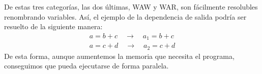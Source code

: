 \documentclass[11pt,twoside,a4paper]{article}
\begin{document}
De estas tres categorías, las dos últimas, WAW y WAR, son fácilmente resolubles renombrando variables.
Así, el ejemplo de la dependencia de salida podría ser resuelto de la siguiente manera:
\begin{gather*}
	a = b + c \quad\to\quad a_1 = b + c\\
	a = c + d \quad\to\quad a_2 = c + d
\end{gather*}
De esta forma, aunque aumentemos la memoria que necesita el programa, conseguimos que pueda ejecutarse de
forma paralela.
\end{document}
